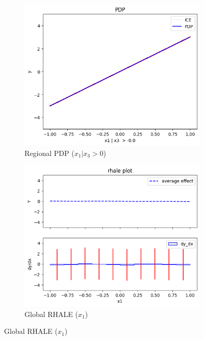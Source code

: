 \documentclass[
twocolumn,
]{ceurart}
\begin{document}
\begin{figure}[t]
\begin{subfigure}[b]{0.33\textwidth}
        \label{subfig:b}
    \end{subfigure}
    \begin{subfigure}[b]{0.33\textwidth}
        \centering
        \includegraphics[width=\textwidth]{figures/simulation_1/uncor_regional_pdp_2.png}
        \caption{Regional PDP ($x_1 | x_3 > 0$)}
        \label{subfig:b}
    \end{subfigure}
    \begin{subfigure}[b]{0.33\textwidth}
        \centering
        \includegraphics[width=\textwidth]{figures/simulation_1/uncor_global_rhale.png}
        \caption{Global RHALE ($x_1$)}

\end{subfigure}
\end{figure}
\end{document}
